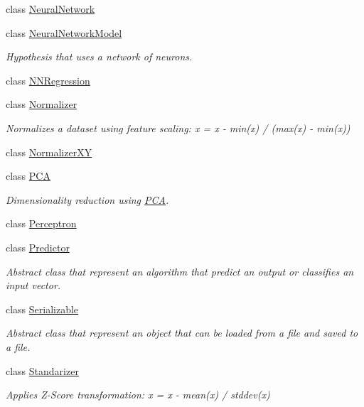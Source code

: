 \begin{DoxyCompactItemize}
class \hyperlink{classhappyml_1_1NeuralNetwork}{Neural\+Network}
\item 
class \hyperlink{classhappyml_1_1NeuralNetworkModel}{Neural\+Network\+Model}
\begin{DoxyCompactList}\small\item\em Hypothesis that uses a network of neurons. \end{DoxyCompactList}\item 
class \hyperlink{classhappyml_1_1NNRegression}{N\+N\+Regression}
\item 
class \hyperlink{classhappyml_1_1Normalizer}{Normalizer}
\begin{DoxyCompactList}\small\item\em Normalizes a dataset using feature scaling\+: x\textquotesingle{} = x -\/ min(x) / (max(x) -\/ min(x)) \end{DoxyCompactList}\item 
class \hyperlink{classhappyml_1_1NormalizerXY}{Normalizer\+XY}
\item 
class \hyperlink{classhappyml_1_1PCA}{P\+CA}
\begin{DoxyCompactList}\small\item\em Dimensionality reduction using \hyperlink{classhappyml_1_1PCA}{P\+CA}. \end{DoxyCompactList}\item 
class \hyperlink{classhappyml_1_1Perceptron}{Perceptron}
\item 
class \hyperlink{classhappyml_1_1Predictor}{Predictor}
\begin{DoxyCompactList}\small\item\em Abstract class that represent an algorithm that predict an output or classifies an input vector. \end{DoxyCompactList}\item 
class \hyperlink{classhappyml_1_1Serializable}{Serializable}
\begin{DoxyCompactList}\small\item\em Abstract class that represent an object that can be loaded from a file and saved to a file. \end{DoxyCompactList}\item 
class \hyperlink{classhappyml_1_1Standarizer}{Standarizer}
\begin{DoxyCompactList}\small\item\em Applies Z-\/\+Score transformation\+: x\textquotesingle{} = x -\/ mean(x) / stddev(x) \end{DoxyCompactList}\item 

\end{DoxyCompactItemize}

